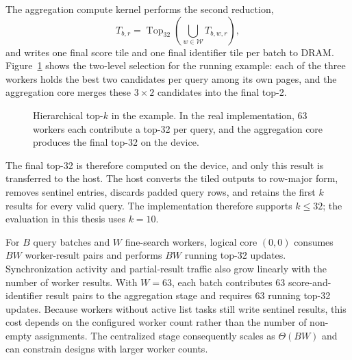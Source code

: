 The aggregation compute kernel performs the second reduction,
\begin{equation}
T_{b,r}=\operatorname{Top}_{32}\left(\bigcup_{w\in\mathcal{W}} T_{b,w,r}\right),
\label{eq:global-top32}
\end{equation} and writes one final score tile and one final identifier tile per batch to DRAM. Figure~\ref{fig:example-topk} shows the two-level selection for the running example: each of the three workers holds the best two candidates per query among its own pages, and the aggregation core merges these \(3\times2\) candidates into the final top-2.

\begin{figure}[htbp]
\centering
{}
\caption{Hierarchical top-\(k\) in the example. In the real implementation, 63
workers each contribute a top-32 per query, and the aggregation core produces
the final top-32 on the device.}
\label{fig:example-topk}
\end{figure}

The final top-32 is therefore computed on the device, and only this result is transferred to the host. The host converts the tiled outputs to row-major form, removes sentinel entries, discards padded query rows, and retains the first \(k\) results for every valid query. The implementation therefore supports \(k\leq32\); the evaluation in this thesis uses \(k=10\).

For \(B\) query batches and \(W\) fine-search workers, logical core \((0,0)\) consumes \(BW\) worker-result pairs and performs \(BW\) running top-32 updates. Synchronization activity and partial-result traffic also grow linearly with the number of worker results. With \(W=63\), each batch contributes 63 score-and-identifier result pairs to the aggregation stage and requires 63 running top-32 updates. Because workers without active list tasks still write sentinel results, this cost depends on the configured worker count rather than the number of non-empty assignments. The centralized stage consequently scales as \(\Theta(BW)\) and can constrain designs with larger worker counts.

